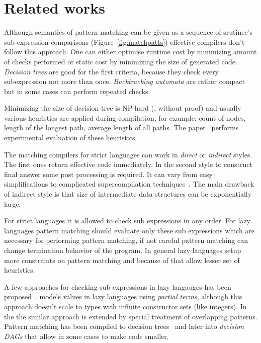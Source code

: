 \section{Related works}
\label{sec:related}

Although semantics of pattern matching can be given as a sequence of srutinee's sub expression comparisons (Figure~\ref{fig:matchpatts}) effective compilers don't follow this approach. One can either optimise runtime cost by minimizing amount of checks performed or static cost by minimizing the size of generated code. \emph{Decision trees} are good for the first criteria, because they check every subexpression not more than once. \emph{Backtracking automata} are rather compact but in some cases can perform repeated checks.


Minimizing the size of decision tree is  NP-hard (\cite{baudinet1985tree}, without proof) and usually various heuristics are applied during compilation, for example: count of nodes, length of the longest path, average length of all paths. The paper~\cite{Scott2000WhenDM} performs experimental evaluation of these heuristics.

The matching compilers for strict languages can work in \emph{direct} or \emph{indirect} styles. The first ones return effective code immediately. In the second style to construct final answer some post processing is required. It can vary from easy simplifications to complicated supercompilation techniques~\cite{sestoft1996}. The main drawback of indirect style is that size of intermediate data structures can be exponentially large.

For strict languages it is allowed to check sub expressions in any order. For lazy languages pattern matching should evaluate only these sub expressions which are necessary for performing pattern matching, if not careful pattern matching can change termination behavior of the program.  In general lazy languages setup more constraints on pattern matching and because of that allow lesser set of heuristics.

A few approaches for checking sub expressions in lazy langauges has been proposed~\cite{augustsson1985,laville1991}. \cite{laville1991} models values in lazy languages using \emph{partial terms}, although this approach doesn't scale to types with infinite constructor sets (like integers). In  the \cite{suarez1993} the similar approach is extended by special treatment of overlapping patterns. Pattern matching has been compiled to decision trees~\cite{maranget1992} and later \cite{maranget1992} into \emph{decision DAGs} that allow in some cases to make code smaller.

